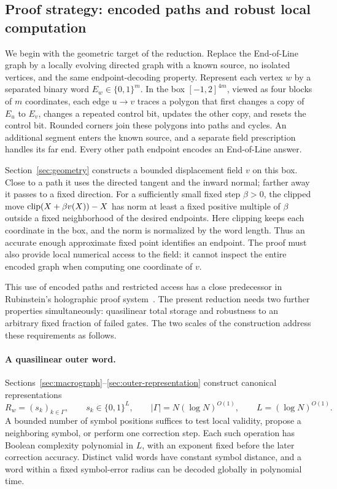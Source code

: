 \subsection{Proof strategy: encoded paths and robust local computation}

We begin with the geometric target of the reduction. Replace the
End-of-Line graph by a locally evolving directed graph with a known
source, no isolated vertices, and the same endpoint-decoding property.
Represent each vertex $w$ by a separated binary word $E_w\in\{0,1\}^m$.
In the box $[-1,2]^{4m}$, viewed as four blocks of $m$ coordinates,
each edge $u\to v$ traces
a polygon that first changes a copy of $E_u$ to $E_v$, changes a repeated
control bit, updates the other copy, and resets the control bit. Rounded
corners join these polygons into paths and cycles. An additional segment
enters the known source, and a separate field prescription handles its
far end. Every other path endpoint encodes an End-of-Line answer.

Section~\ref{sec:geometry} constructs a bounded displacement field $v$
on this box. Close to a path it uses the directed tangent and the inward
normal; farther away it passes to a fixed direction. For a sufficiently
small fixed step $\beta>0$, the clipped move
$\operatorname{clip}(X+\beta v(X))-X$ has norm at least a fixed positive multiple of
$\beta$ outside a fixed neighborhood of the desired endpoints. Here
clipping keeps each coordinate in the box, and the norm is normalized
by the word length. Thus an accurate enough approximate fixed point
identifies an endpoint. The proof must also provide local numerical
access to the field: it cannot inspect the entire encoded graph when
computing one coordinate of $v$.

This use of encoded paths and restricted access has a close predecessor
in Rubinstein's holographic proof system~\cite[Sections~3, 5, and~6]{Rubinstein2016Settling}.
The present reduction needs two further properties simultaneously:
quasilinear total storage and robustness to an arbitrary fixed fraction
of failed gates. The two scales of the construction address these
requirements as follows.

\paragraph{A quasilinear outer word.}
Sections~\ref{sec:macrograph}--\ref{sec:outer-representation} construct
canonical representations
\[
 R_w=(s_k)_{k\in\Gamma},\qquad
 s_k\in\{0,1\}^L,\qquad
 |\Gamma|=N(\log N)^{O(1)},\qquad L=(\log N)^{O(1)}.
\]
A bounded number of symbol positions suffices to test local validity,
propose a neighboring symbol, or perform one correction step. Each such
operation has Boolean complexity polynomial in $L$, with an exponent
fixed before the later correction accuracy. Distinct valid words have
constant symbol distance, and a word within a fixed symbol-error radius
can be decoded globally in polynomial time.

